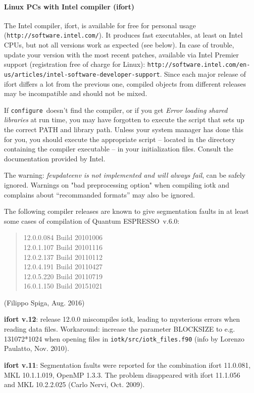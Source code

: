 \documentclass[12pt,a4paper]{article}
\def\qe{{\sc Quantum ESPRESSO}}
\def\configure{\texttt{configure}}
\begin{document}
\paragraph{Linux PCs with Intel compiler (ifort)}

The Intel compiler, ifort, is available for free for personal
usage (\texttt{http://software.intel.com/}). It produces fast executables,
at least on Intel CPUs, but not all versions work as expected (see below).
In case of trouble, update your version with the most recent patches,
available via Intel Premier support (registration free of charge for Linux):
\texttt{http://software.intel.com/en-us/articles/intel-software-developer-support}.
Since each major release of ifort
differs a lot from the previous one, compiled objects from different
releases may be incompatible and should not be mixed.

If \configure\ doesn't find the compiler, or if you get
{\em Error loading shared libraries} at run time, you may have
forgotten to execute the script that
sets up the correct PATH and library path. Unless your system manager has
done this for you, you should execute the appropriate script -- located in
the directory containing the compiler executable -- in your
initialization files. Consult the documentation provided by Intel.

The warning: {\em feupdateenv is not implemented and will always fail},
can be safely ignored. Warnings on "bad preprocessing option" when compiling
iotk and complains about ``recommanded formats'' may also be ignored.

The following compiler releases are known to give segmentation faults
in at least some cases of compilation of \qe\ v.6.0:
\begin{quote}
12.0.0.084 Build 20101006\\
12.0.1.107 Build 20101116\\
12.0.2.137 Build 20110112\\
12.0.4.191 Build 20110427\\
12.0.5.220 Build 20110719\\
16.0.1.150 Build 20151021
\end{quote}
(Filippo Spiga, Aug. 2016)

{\bf ifort v.12}: release 12.0.0 miscompiles iotk, leading to
mysterious errors when reading data files. Workaround: increase
the parameter BLOCKSIZE to e.g. 131072*1024 when opening files in
\texttt{iotk/src/iotk\_files.f90} (info by Lorenzo Paulatto,
Nov. 2010). 

{\bf ifort v.11}: Segmentation faults were reported for the combination
ifort 11.0.081, MKL 10.1.1.019, OpenMP 1.3.3. The problem disappeared
with ifort 11.1.056 and MKL 10.2.2.025 (Carlo Nervi, Oct. 2009).
\end{document}
